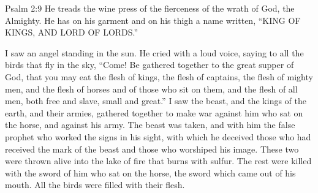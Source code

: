 {{Psalm 2:9
} He treads the wine press of the fierceness of the wrath of God, the Almighty.
He has on his garment and on his thigh a name written, “KING OF KINGS, AND LORD OF LORDS.”
\par }{\PP {}I saw an angel standing in the sun. He cried with a loud voice, saying to all the birds that fly in the sky, “Come! Be gathered together to the great supper of God,
that you may eat the flesh of kings, the flesh of captains, the flesh of mighty men, and the flesh of horses and of those who sit on them, and the flesh of all men, both free and slave, small and great.”
I saw the beast, and the kings of the earth, and their armies, gathered together to make war against him who sat on the horse, and against his army.
The beast was taken, and with him the false prophet who worked the signs in his sight, with which he deceived those who had received the mark of the beast and those who worshiped his image. These two were thrown alive into the lake of fire that burns with sulfur.
The rest were killed with the sword of him who sat on the horse, the sword which came out of his mouth. All the birds were filled with their flesh.

}
